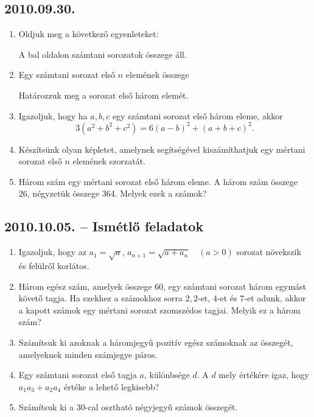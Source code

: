 \subsection*{2010.09.30.}
\begin{enumerate}
\item Oldjuk meg a következő egyenleteket:
A bal oldalon számtani sorozatok összege áll.
\item Egy számtani sorozat első $n$ elemének összege
Határozzuk meg a sorozat első három elemét.
\item Igazoljuk, hogy ha $a,b,c$ egy számtani sorozat első három eleme, akkor
$$3(a^2+b^2+c^2)=6(a-b)^2+(a+b+c)^2.$$
\item Készítsünk olyan képletet, amelynek segítségével kiszámíthatjuk egy mértani sorozat első $n$ elemének szorzatát.
\item Három szám egy mértani sorozat első három eleme. A három szám összege 26, négyzetük összege 364. Melyek ezek a számok?
\end{enumerate}


\subsection*{2010.10.05. -- Ismétlő feladatok}
\begin{enumerate}
\item Igazoljuk, hogy az $a_1=\sqrt{a}$, $a_{n+1}=\sqrt{a+a_n}\quad(a>0)$ sorozat növekszik és felülről korlátos.
\item Három egész szám, amelyek összege 60, egy számtani sorozat három egymást követő tagja.
Ha ezekhez a számokhoz sorra $2{,}2$-et, $4$-et és $7$-et adunk, akkor a kapott számok egy mértani sorozat szomszédos tagjai. Melyik ez a három szám?

\item Számítsuk ki azoknak a háromjegyű pozitív egész számoknak az összegét, amelyeknek minden számjegye páros.
\item Egy számtani sorozat első tagja $a$, különbsége $d$. A $d$ mely értékére igaz, hogy $a_1a_3+a_2a_4$ értéke a lehető legkisebb?
\item Számítsuk ki a 30-cal osztható négyjegyű számok összegét.
\end{enumerate}


